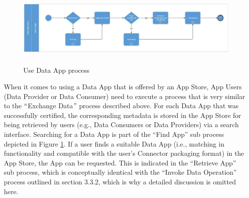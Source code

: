 



\begin{figure}[H]
	\begin{Center}
		\includegraphics[width=6.53in,height=1.53in]{./media/image30.jpeg}
		\caption{Use Data App process}
		\label{fig:use_data_app}
	\end{Center}
\end{figure}

When it comes to using a Data App that is offered by an App Store, App Users (Data Provider or Data Consumer) need to execute a process that is very similar to the $``$Exchange Data$"$  process described above.
For each Data App that was successfully certified, the corresponding metadata is stored in the App Store for being retrieved by users (e.g., Data Consumers or Data Providers) via a search interface. Searching for a Data App is part of the “Find App” sub process depicted in Figure \ref{fig:use_data_app}. If a user finds a suitable Data App (i.e., matching in functionality and compatible with the user’s Connector packaging format) in the App Store, the App can be requested. This is indicated in the “Retrieve App” sub process, which is conceptually identical with the “Invoke Data Operation” process outlined in section 3.3.2, which is why a detailed discussion is omitted here.

